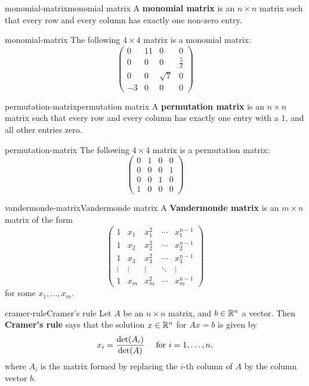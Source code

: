 \begin{topic}{monomial-matrix}{monomial matrix}
    A \textbf{monomial matrix} is an $n \times n$ matrix such that every row and every column has exactly one non-zero entry.
\end{topic}

\begin{example}{monomial-matrix}
    The following $4 \times 4$ matrix is a monomial matrix:
    \[ \begin{pmatrix} 0 & 11 & 0 & 0 \\ 0 & 0 & 0 & \frac{5}{2} \\ 0 & 0 & \sqrt{7} & 0 \\ -3 & 0 & 0 & 0 \end{pmatrix} \]
\end{example}

\begin{topic}{permutation-matrix}{permutation matrix}
    A \textbf{permutation matrix} is an $n \times n$ matrix such that every row and every column has exactly one entry with a $1$, and all other entries zero.
\end{topic}

\begin{example}{permutation-matrix}
    The following $4 \times 4$ matrix is a permutation matrix:
    \[ \begin{pmatrix} 0 & 1 & 0 & 0 \\ 0 & 0 & 0 & 1 \\ 0 & 0 & 1 & 0 \\ 1 & 0 & 0 & 0 \end{pmatrix} \]
\end{example}

\begin{topic}{vandermonde-matrix}{Vandermonde matrix}
    A \textbf{Vandermonde matrix} is an $m \times n$ matrix of the form
    \[ \begin{pmatrix} 1 & x_1 & x_1^2 & \cdots & x_1^{n - 1} \\ 1 & x_2 & x_2^2 & \cdots & x_2^{n - 1} \\ 1 & x_3 & x_3^2 & \cdots & x_3^{n - 1} \\ \vdots & \vdots & \vdots & \ddots & \vdots \\ 1 & x_m & x_m^2 & \cdots & x_m^{n - 1} \end{pmatrix} \]
    for some $x_1, \ldots, x_m$.
\end{topic}

\begin{topic}{cramer-rule}{Cramer's rule}
    Let $A$ be an  $n \times n$ matrix, and $b \in \mathbb{R}^n$ a vector. Then \textbf{Cramer's rule} says that the solution $x \in \mathbb{R}^n$ for $Ax = b$ is given by
    \[ x_i = \frac{\det(A_i)}{\det(A)} \quad \textup{ for } i = 1, \ldots, n, \]
    where $A_i$ is the matrix formed by replacing the $i$-th column of $A$ by the column vector $b$.
\end{topic}

